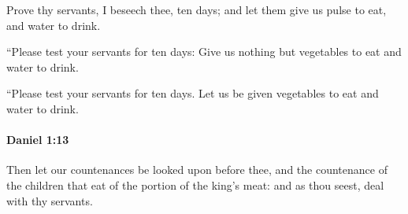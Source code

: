 			\begin{versebox}
					\item[BHS] 
					\item[LXX] 
					\item[ASV] Prove thy servants, I beseech thee, ten days; and let them give us pulse to eat, and water to drink.
					\item[NIV] “Please test your servants for ten days: Give us nothing but vegetables to eat and water to drink.
					\item[NRSV] “Please test your servants for ten days. Let us be given vegetables to eat and water to drink.
			\end{versebox}

		\paragraph{Daniel 1:13} %
			\label{DANIEL-1-13}

			Then let our countenances be looked upon before thee, and the countenance of the children that eat of the portion of the king’s meat: and as thou seest, deal with thy servants.

